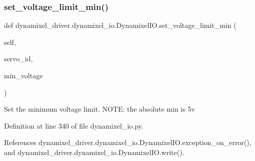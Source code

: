 \subsubsection{\texorpdfstring{set\+\_\+voltage\+\_\+limit\+\_\+min()}{set\_voltage\_limit\_min()}}
{\footnotesize\ttfamily def dynamixel\+\_\+driver.\+dynamixel\+\_\+io.\+Dynamixel\+I\+O.\+set\+\_\+voltage\+\_\+limit\+\_\+min (\begin{DoxyParamCaption}\item[{}]{self,  }\item[{}]{servo\+\_\+id,  }\item[{}]{min\+\_\+voltage }\end{DoxyParamCaption})}

\begin{DoxyVerb}Set the minimum voltage limit.
NOTE: the absolute min is 5v
\end{DoxyVerb}
 

Definition at line 340 of file dynamixel\+\_\+io.\+py.



References dynamixel\+\_\+driver.\+dynamixel\+\_\+io.\+Dynamixel\+I\+O.\+exception\+\_\+on\+\_\+error(), and dynamixel\+\_\+driver.\+dynamixel\+\_\+io.\+Dynamixel\+I\+O.\+write().


